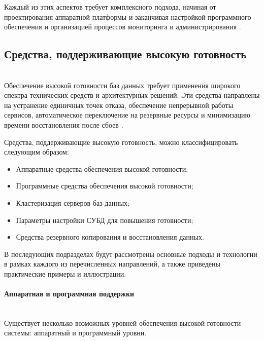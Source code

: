 Каждый из этих аспектов требует комплексного подхода, начиная от проектирования аппаратной платформы и заканчивая настройкой программного обеспечения и организацией процессов мониторинга и администрирования \autocite{Kleppmann}.

\subsection{Средства, поддерживающие высокую готовность} ~\\

Обеспечение высокой готовности баз данных требует применения широкого спектра технических средств и архитектурных решений. Эти средства направлены на устранение единичных точек отказа, обеспечение непрерывной работы сервисов, автоматическое переключение на резервные ресурсы и минимизацию времени восстановления после сбоев \autocites{RajeshKumar}{SameerParadkar}.

Средства, поддерживающие высокую готовность, можно классифицировать следующим образом:
\begin{itemize}
    \item Аппаратные средства обеспечения высокой готовности;
    \item Программные средства обеспечения высокой готовности;
    \item Кластеризация серверов баз данных;
    \item Параметры настройки СУБД для повышения готовности;
    \item Средства резервного копирования и восстановления данных.
\end{itemize}

В последующих подразделах будут рассмотрены основные подходы и технологии в рамках каждого из перечисленных направлений, а также приведены практические примеры и иллюстрации.


\paragraph{Аппаратная и программная поддержки} ~\\
Существует несколько возможных уровней обеспечения высокой готовности системы: аппаратный и программный уровни. \\
